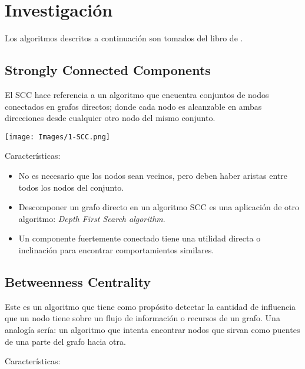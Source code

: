 \section{Investigación}

Los algoritmos descritos a continuación son tomados del libro de \cite{needham2019graph}. 

\subsection{Strongly Connected Components}

El SCC hace referencia a un algoritmo que encuentra conjuntos de nodos conectados en grafos directos; donde cada nodo es alcanzable en ambas direcciones desde cualquier otro nodo del mismo conjunto. 

\begin{center}
\texttt{[image: Images/1-SCC.png]}    
\end{center}

Características: 

\begin{itemize}
    \item No es necesario que los nodos sean vecinos, pero deben haber aristas entre todos los nodos del conjunto. 
    \item Descomponer un grafo directo en un algoritmo SCC es una aplicación de otro algoritmo: \textit{Depth First Search algorithm}.  
    \item Un componente fuertemente conectado tiene una utilidad directa o inclinación para encontrar comportamientos similares. 
\end{itemize}

\subsection{Betweenness Centrality}

Este es un algoritmo que tiene como propósito detectar la cantidad de influencia que un nodo tiene sobre un flujo de información o recursos de un grafo. Una analogía sería: un algoritmo que intenta encontrar nodos que sirvan como puentes de una parte del grafo hacia otra. 

Características: 

